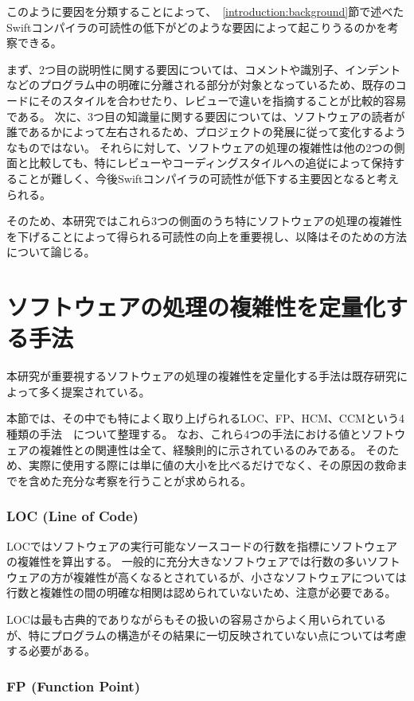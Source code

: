 このように要因を分類することによって、~\ref{introduction:background}節で述べたSwiftコンパイラの可読性の低下がどのような要因によって起こりうるのかを考察できる。

まず、2つ目の説明性に関する要因については、コメントや識別子、インデントなどのプログラム中の明確に分離される部分が対象となっているため、既存のコードにそのスタイルを合わせたり、レビューで違いを指摘することが比較的容易である。
次に、3つ目の知識量に関する要因については、ソフトウェアの読者が誰であるかによって左右されるため、プロジェクトの発展に従って変化するようなものではない。
それらに対して、ソフトウェアの処理の複雑性は他の2つの側面と比較しても、特にレビューやコーディングスタイルへの追従によって保持することが難しく、今後Swiftコンパイラの可読性が低下する主要因となると考えられる。

そのため、本研究ではこれら3つの側面のうち特にソフトウェアの処理の複雑性を下げることによって得られる可読性の向上を重要視し、以降はそのための方法について論じる。


\section{ソフトウェアの処理の複雑性を定量化する手法}
\label{issue:method}

本研究が重要視するソフトウェアの処理の複雑性を定量化する手法は既存研究によって多く提案されている。

本節では、その中でも特によく取り上げられるLOC、FP、HCM、CCMという4種類の手法~\cite{yu}~\cite{symons}について整理する。
なお、これら4つの手法における値とソフトウェアの複雑性との関連性は全て、経験則的に示されているのみである。
そのため、実際に使用する際には単に値の大小を比べるだけでなく、その原因の救命までを含めた充分な考察を行うことが求められる。

\subsubsection{LOC (Line of Code)}

LOCではソフトウェアの実行可能なソースコードの行数を指標にソフトウェアの複雑性を算出する。
一般的に充分大きなソフトウェアでは行数の多いソフトウェアの方が複雑性が高くなるとされているが、小さなソフトウェアについては行数と複雑性の間の明確な相関は認められていないため、注意が必要である。

LOCは最も古典的でありながらもその扱いの容易さからよく用いられているが、特にプログラムの構造がその結果に一切反映されていない点については考慮する必要がある。

\subsubsection{FP (Function Point)}

